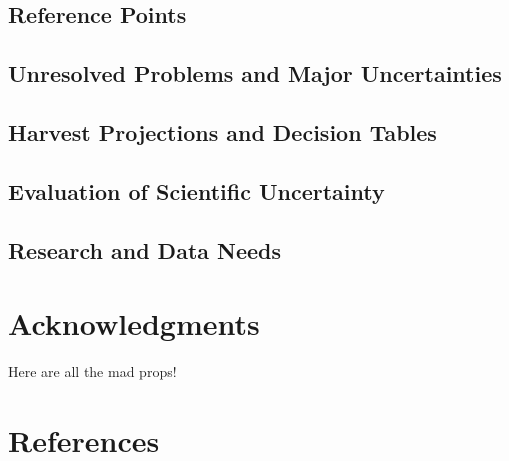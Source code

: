\documentclass[11pt,
  english,
  letterpaper,
]{article}
\begin{document}
\hypertarget{reference-points-2}{%
\subsection{Reference Points}\label{reference-points-2}}

\hypertarget{unresolved-problems-and-major-uncertainties-2}{%
\subsection{Unresolved Problems and Major Uncertainties}\label{unresolved-problems-and-major-uncertainties-2}}

\hypertarget{harvest-projections-and-decision-tables}{%
\subsection{Harvest Projections and Decision Tables}\label{harvest-projections-and-decision-tables}}

\hypertarget{evaluation-of-scientific-uncertainty}{%
\subsection{Evaluation of Scientific Uncertainty}\label{evaluation-of-scientific-uncertainty}}

\hypertarget{research-and-data-needs-1}{%
\subsection{Research and Data Needs}\label{research-and-data-needs-1}}

\hypertarget{acknowledgments}{%
\section{Acknowledgments}\label{acknowledgments}}

Here are all the mad props!

\clearpage

\hypertarget{references}{%
\section{References}\label{references}}
\end{document}
